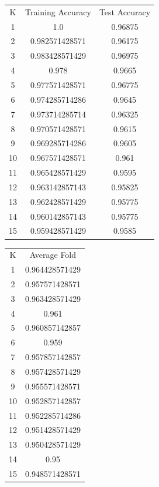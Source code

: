 \documentclass[letterpaper, 12]{article}
\begin{document}
\begin{center}
\begin{tabular}{ |c|c|c| } 
\hline
K & Training Accuracy & Test Accuracy  \\
1  &  1.0  &  0.96875 \\
2  &  0.982571428571  &  0.96175 \\
3  &  0.983428571429  &  0.96975  \\
4  &  0.978  &  0.9665 \\
5  &  0.977571428571  &  0.96775 \\
6  &  0.974285714286  &  0.9645  \\
7  &  0.973714285714  &  0.96325 \\
8  &  0.970571428571  &  0.9615  \\
9  &  0.969285714286  &  0.9605  \\
10  &  0.967571428571  &  0.961 \\
11  &  0.965428571429  &  0.9595 \\
12  &  0.963142857143  &  0.95825 \\
13  &  0.962428571429  &  0.95775 \\
14  &  0.960142857143  &  0.95775 \\
15  &  0.959428571429  &  0.9585  \\
 \hline
\end{tabular}
\end{center}


\begin{center}
\begin{tabular}{ |c|c| } 
 \hline
K & Average Fold \\ 
1  &  0.964428571429\\
2  &  0.957571428571\\
3  &  0.963428571429\\
4  &  0.961\\
5  &  0.960857142857\\
6  &  0.959\\
7  &  0.957857142857\\
8  &  0.957428571429\\
9  &  0.955571428571\\
10  &  0.952857142857\\
11  &  0.952285714286\\
12  &  0.951428571429\\
13  &  0.950428571429\\
14  &  0.95\\
15  &  0.948571428571\\
 \hline
\end{tabular}
\end{center}
\end{document}
